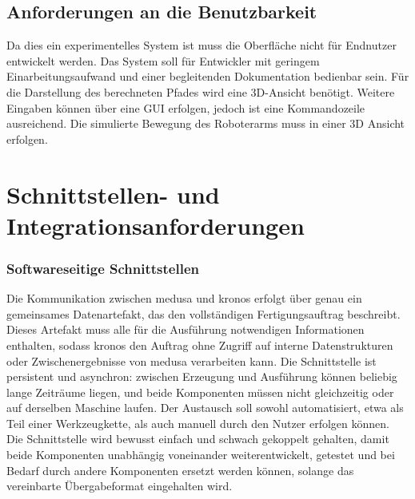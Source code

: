         \subsection{Anforderungen an die Benutzbarkeit}\label{subsec:requirements-for-usability}
            Da dies ein experimentelles System ist muss die Oberfläche nicht für Endnutzer entwickelt werden.
            Das System soll für Entwickler mit geringem Einarbeitungsaufwand und einer begleitenden Dokumentation bedienbar sein.
            Für die Darstellung des berechneten Pfades wird eine 3D-Ansicht benötigt.
            Weitere Eingaben können über eine \ac{GUI} erfolgen, jedoch ist eine Kommandozeile ausreichend.
            Die simulierte Bewegung des Roboterarms muss in einer 3D Ansicht erfolgen.

    \section{Schnittstellen- und Integrationsanforderungen}\label{sec:interface-and-integration-requirements}
        \subsubsection{Softwareseitige Schnittstellen}\label{subsubsec:requirements-software-interfaces}
            Die Kommunikation zwischen \ac{medusa} und \ac{kronos} erfolgt über genau ein gemeinsames Datenartefakt,
            das den vollständigen Fertigungsauftrag beschreibt.
            Dieses Artefakt muss alle für die Ausführung notwendigen Informationen enthalten,
            sodass \ac{kronos} den Auftrag ohne Zugriff auf interne Datenstrukturen oder Zwischenergebnisse von \ac{medusa} verarbeiten kann.
            Die Schnittstelle ist persistent und asynchron:
            zwischen Erzeugung und Ausführung können beliebig lange Zeiträume liegen, und beide Komponenten müssen nicht gleichzeitig oder auf derselben Maschine laufen.
            Der Austausch soll sowohl automatisiert, etwa als Teil einer Werkzeugkette, als auch manuell durch den Nutzer erfolgen können.
            Die Schnittstelle wird bewusst einfach und schwach gekoppelt gehalten, damit beide Komponenten unabhängig voneinander weiterentwickelt,
            getestet und bei Bedarf durch andere Komponenten ersetzt werden können, solange das vereinbarte Übergabeformat eingehalten wird.

